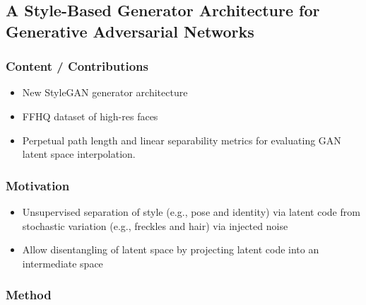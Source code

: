 \documentclass[a4paper, 12pt]{article}
\begin{document}
\subsection{A Style-Based Generator Architecture for Generative Adversarial
            Networks~\cite{karras2019astylebased}}

\subsubsection{Content / Contributions}

\begin{itemize}
        \item New StyleGAN generator architecture

        \item FFHQ dataset of high-res faces

        \item Perpetual path length and linear separability metrics for
                evaluating GAN latent space interpolation.
\end{itemize}


\subsubsection{Motivation}

\begin{itemize}
        \item Unsupervised separation of style (e.g., pose and identity) via
                latent code from stochastic variation (e.g., freckles and hair)
                via injected noise

        \item Allow disentangling of latent space by projecting latent code
                into an intermediate space
\end{itemize}


\subsubsection{Method}
\end{document}
